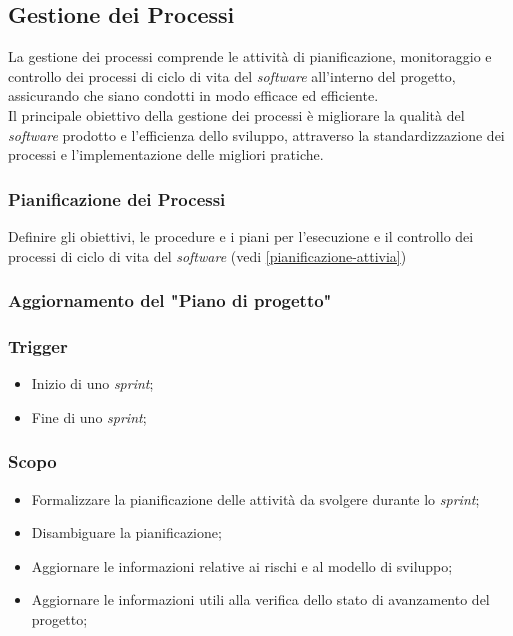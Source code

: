 \subsection{Gestione dei Processi}

La gestione dei processi comprende le attività di pianificazione, monitoraggio
e controllo dei processi di ciclo di vita del \textit{software} all'interno del
progetto, assicurando che siano condotti in modo efficace ed efficiente.\\
Il principale obiettivo della gestione dei processi è migliorare la qualità
del \textit{software} prodotto e l'efficienza dello sviluppo, attraverso la
standardizzazione dei processi e l'implementazione delle migliori pratiche.

\subsubsection{Pianificazione dei Processi} 
Definire gli obiettivi, le
	  procedure e i piani per l'esecuzione e il controllo dei processi di
	  ciclo di vita del \textit{software} (vedi
	  \cref{pianificazione-attivia}) 




\subsubsection{Aggiornamento del "Piano di progetto"}
\label{aggiornare-pdp}

\subsubsection*{Trigger}
\begin{itemize}
	\item Inizio di uno \textit{sprint};
	\item Fine di uno \textit{sprint};
\end{itemize}

\subsubsection*{Scopo}
\begin{itemize}
	\item Formalizzare la pianificazione delle attività da svolgere durante
		lo \textit{sprint};

	\item Disambiguare la pianificazione;

	\item Aggiornare le informazioni relative ai rischi e al modello di
		sviluppo;

	\item Aggiornare le informazioni utili alla verifica dello stato di
		avanzamento del progetto;
\end{itemize}

